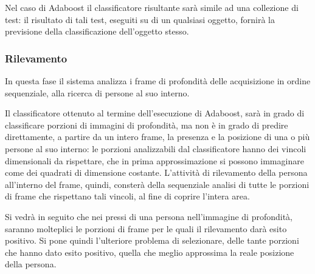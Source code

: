                 Nel caso di Adaboost il classificatore risultante sarà simile ad una collezione di test: il risultato di tali test, eseguiti su di un qualsiasi oggetto, fornirà la previsione della classificazione dell'oggetto stesso.

            \subsubsection{Rilevamento}
                In questa fase il sistema analizza i frame di profondità delle acquisizione in ordine sequenziale, alla ricerca di persone al suo interno.

                Il classificatore ottenuto al termine dell'esecuzione di Adaboost, sarà in grado di classificare porzioni di immagini di profondità, ma non è in grado di predire direttamente, a partire da un intero frame, la presenza e la posizione di una o più persone al suo interno: le porzioni analizzabili dal classificatore hanno dei vincoli dimensionali da rispettare, che in prima approssimazione si possono immaginare come dei quadrati di dimensione costante.
                L'attività di rilevamento della persona all'interno del frame, quindi, consterà della sequenziale analisi di tutte le porzioni di frame che rispettano tali vincoli, al fine di coprire l'intera area.

                Si vedrà in seguito che nei pressi di una persona nell'immagine di profondità, saranno molteplici le porzioni di frame per le quali il rilevamento darà esito positivo.
                Si pone quindi l'ulteriore problema di selezionare, delle tante porzioni che hanno dato esito positivo, quella che meglio approssima la reale posizione della persona. 
